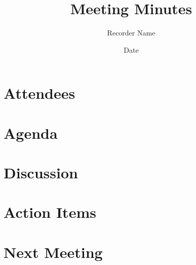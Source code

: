 \documentclass[12pt]{article}
\begin{document}
\title{Meeting Minutes}
\author{Recorder Name}
\date{Date}
\maketitle

\section*{Attendees}

\section*{Agenda}

\section*{Discussion}

\section*{Action Items}

\section*{Next Meeting}
\end{document}
